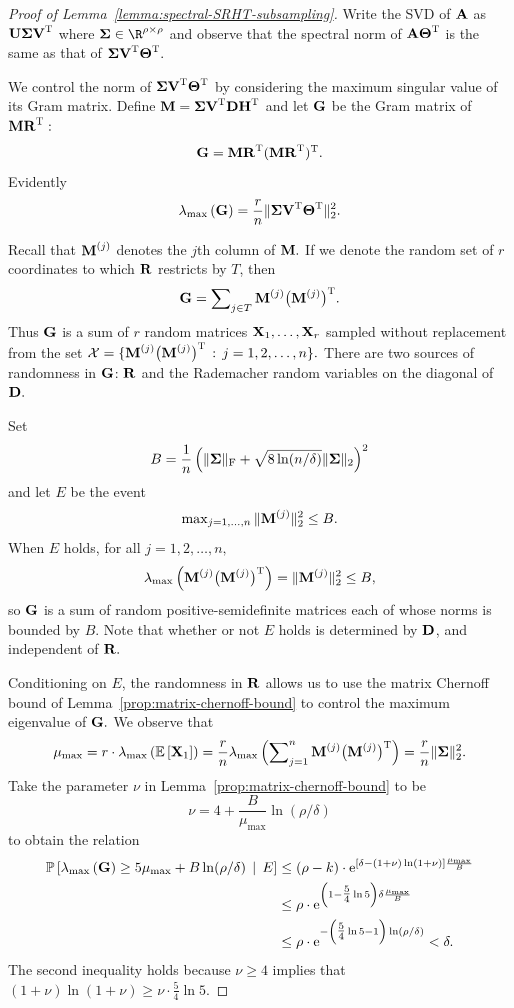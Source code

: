\begin{proof}[Proof of Lemma~\ref{lemma:spectral-SRHT-subsampling}]

Write the SVD of ${\bm{\mathrm{A}}}$ as ${\bm{\mathrm{U}}} {\bm{\mathrm{\Sigma}}} {\bm{\mathrm{V}}}^{\textsc{T}}$ where $\matSig \in \R^{\rho \times \rho}$ and observe that the spectral norm of ${\bm{\mathrm{A}}}{\bm{\mathrm{\Theta}}}^{\textsc{T}}$ is the same as that of ${\bm{\mathrm{\Sigma}}} {\bm{\mathrm{V}}}^{\textsc{T}}{\bm{\mathrm{\Theta}}}^{\textsc{T}}.$

We control the norm of ${\bm{\mathrm{\Sigma}}} {\bm{\mathrm{V}}}^{\textsc{T}} {\bm{\mathrm{\Theta}}}^{\textsc{T}}$ by considering the maximum singular value of its Gram matrix. Define ${\bm{\mathrm{M}}} = {\bm{\mathrm{\Sigma}}} {\bm{\mathrm{V}}} ^{\textsc{T}} {\bm{\mathrm{D}}} {\bm{\mathrm{H}}} ^{\textsc{T}}$ and let ${\bm{\mathrm{G}}}$ be the Gram matrix of ${\bm{\mathrm{M}}} {\bm{\mathrm{R}}} ^{\textsc{T}}:$
\[
 {\bm{\mathrm{G}}} = {\bm{\mathrm{M}}} {\bm{\mathrm{R}}} ^{\textsc{T}} ({\bm{\mathrm{M}}} {\bm{\mathrm{R}}} ^{\textsc{T}}) ^{\textsc{T}}.
\]
 Evidently
\begin{equation}
\label{eqn:gram-identity}
 \lambdamax{\matG} = \frac{r}{n} \TNormS{\matSig \matV \transp \matTh \transp}.
\end{equation}

Recall that ${\bm{\mathrm{M}}}^{(j)}$ denotes the $j$th column of ${\bm{\mathrm{M}}}.$ If we denote the random set of $r$ coordinates to which ${\bm{\mathrm{R}}}$ restricts by $T$, then
\[
 {\bm{\mathrm{G}}} = \sum\nolimits_{j \in T} {\bm{\mathrm{M}}}^{(j)} \big({\bm{\mathrm{M}}}^{(j)}\big) ^{\textsc{T}}.
\]
Thus ${\bm{\mathrm{G}}}$ is a sum of $r$ random matrices ${\bm{\mathrm{X}}}_1, \ldots, {\bm{\mathrm{X}}}_r$ sampled without replacement from the set $\mathcal{X} = \{ {\bm{\mathrm{M}}}^{(j)} \big({\bm{\mathrm{M}}}^{(j)}\big) ^{\textsc{T}} \,:\, j=1,2,\ldots,n\}.$
There are two sources of randomness in ${\bm{\mathrm{G}}}$: ${\bm{\mathrm{R}}}$ and the Rademacher random variables on the diagonal of ${\bm{\mathrm{D}}}.$

Set
\[
 B = {1\over n} \left( \mbox{}\|{\bm{\mathrm{\Sigma}}}\|_\mathrm{F} + \sqrt{8 \ln(n/\delta)} \mbox{}\|{\bm{\mathrm{\Sigma}}}\|_2 \right)^2
 \]
and let $E$ be the event
\[
 \max\nolimits_{j=1,\ldots,n}\mbox{}\|{\bm{\mathrm{M}}}^{(j)}\|_2^2 \leq B.
\]
When $E$ holds, for all $j =1,2,\ldots,n,$
\[
 \lambda_{\mathrm{max}}\left({\bm{\mathrm{M}}}^{(j)} \big({\bm{\mathrm{M}}}^{(j)}\big) ^{\textsc{T}}\right) = \mbox{}\|{\bm{\mathrm{M}}}^{(j)}\|_2^2 \leq B,
\]
so ${\bm{\mathrm{G}}}$ is a sum of random positive-semidefinite matrices each of whose norms is bounded by $B.$
Note that whether or not $E$ holds is determined by ${\bm{\mathrm{D}}}$, and independent of ${\bm{\mathrm{R}}}.$

Conditioning on $E$, the randomness in ${\bm{\mathrm{R}}}$ allows us to use the matrix Chernoff bound of Lemma~\ref{prop:matrix-chernoff-bound} to control the maximum eigenvalue of ${\bm{\mathrm{G}}}.$
We observe that
\[
 \mu_{\text{max}} = r \cdot \lambda_{\mathrm{max}}\left(\mbox{}{\mathbb{E}}\left[{\bm{\mathrm{X}}}_1\right]\right) = {r\over n} \lambda_{\mathrm{max}}\left(\sum\nolimits_{j=1}^n {\bm{\mathrm{M}}}^{(j)} \big({\bm{\mathrm{M}}}^{(j)}\big)^{\textsc{T}}\right) = {r\over n} \mbox{}\|{\bm{\mathrm{\Sigma}}}\|_2^2.
\]
Take the parameter $\nu$ in Lemma~\ref{prop:matrix-chernoff-bound} to be
\[
 \nu = 4 + \frac{B}{\mu_{\text{max}}} \ln (\rho/\delta)
\]
to obtain the relation
\begin{align*}
 \mbox{}{\mathbb{P}}\left[ \lambda_{\mathrm{max}}\left({\bm{\mathrm{G}}}\right) \geq 5 \mu_{\text{max}} + B \ln (\rho/\delta)\, \mid\, E \right] & \leq (\rho-k) \cdot {\mathrm e}^{[\delta - (1+\nu) \ln (1 + \nu)] {\mu_{\text{max}}\over B}} \\
 & \leq \rho \cdot {\mathrm e}^{\left(1-\tfrac{5}{4}\ln 5\right) \delta {\mu_{\text{max}}\over B}} \\
 & \leq \rho \cdot {\mathrm e}^{-\left(\tfrac{5}{4} \ln 5 -1\right) \ln (\rho/\delta)} < \delta.
\end{align*}
The second inequality holds because $\nu \geq 4$ implies that $(1 + \nu) \ln(1+\nu) \geq \nu\cdot \tfrac{5}{4}\ln 5 .$


\end{proof}
